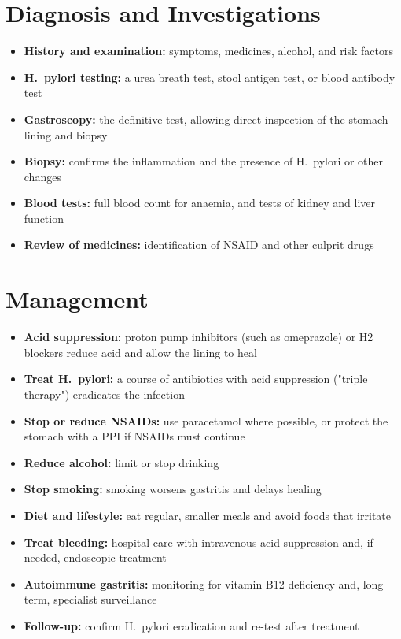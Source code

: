 \section*{Diagnosis and Investigations}
\begin{itemize}
    \item \textbf{History and examination:} symptoms, medicines, alcohol, and risk factors
    \item \textbf{H.\ pylori testing:} a urea breath test, stool antigen test, or blood antibody test
    \item \textbf{Gastroscopy:} the definitive test, allowing direct inspection of the stomach lining and biopsy
    \item \textbf{Biopsy:} confirms the inflammation and the presence of H.\ pylori or other changes
    \item \textbf{Blood tests:} full blood count for anaemia, and tests of kidney and liver function
    \item \textbf{Review of medicines:} identification of NSAID and other culprit drugs
\end{itemize}

\section*{Management}
\begin{itemize}
    \item \textbf{Acid suppression:} proton pump inhibitors (such as omeprazole) or H2 blockers reduce acid and allow the lining to heal
    \item \textbf{Treat H.\ pylori:} a course of antibiotics with acid suppression ("triple therapy") eradicates the infection
    \item \textbf{Stop or reduce NSAIDs:} use paracetamol where possible, or protect the stomach with a PPI if NSAIDs must continue
    \item \textbf{Reduce alcohol:} limit or stop drinking
    \item \textbf{Stop smoking:} smoking worsens gastritis and delays healing
    \item \textbf{Diet and lifestyle:} eat regular, smaller meals and avoid foods that irritate
    \item \textbf{Treat bleeding:} hospital care with intravenous acid suppression and, if needed, endoscopic treatment
    \item \textbf{Autoimmune gastritis:} monitoring for vitamin B12 deficiency and, long term, specialist surveillance
    \item \textbf{Follow-up:} confirm H.\ pylori eradication and re-test after treatment
\end{itemize}

